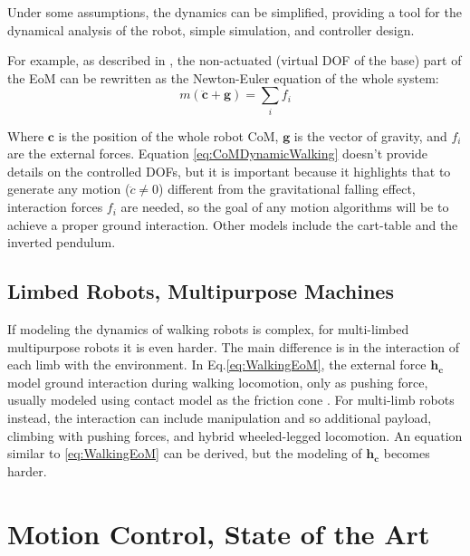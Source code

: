 Under some assumptions, the dynamics can be simplified\cite{Legged}\cite{HumanoidRobot}\cite{HandbookLegged}\cite{ModelingControlLegged}, providing a tool for the dynamical analysis of the robot, simple simulation, and controller design.  

For example, as described in \cite{ModelingControlLegged}\cite{Legged}\cite{ArticulatedRobots}, the non-actuated (virtual DOF of the base) part of the EoM can be rewritten as the Newton-Euler equation of the whole system: 
\begin{equation}
    \label{eq:CoMDynamicWalking}
    m(\ddot{\mathbf{c}} + \mathbf{g}) = \sum_i{f_i}
\end{equation}

Where $\mathbf{c}$ is the position of the whole robot CoM, $\mathbf{g}$ is the vector of gravity, and $f_i$ are the external forces. 
Equation \ref{eq:CoMDynamicWalking} doesn't provide details on the controlled DOFs, but it is important because it highlights that to generate any motion ($\ddot{c} \not= 0$) different from the gravitational falling effect, interaction forces $f_i$ are needed, so the goal of any motion algorithms will be to achieve a proper ground interaction.
Other models include the cart-table and the inverted pendulum\cite{Todd}.


\subsection{Limbed Robots, Multipurpose Machines}
\label{sec:limbedDyn}
If modeling the dynamics of walking robots is complex, for multi-limbed multipurpose robots it is even harder. The main difference is in the interaction of each limb with the environment. In Eq.\ref{eq:WalkingEoM}, the external force $\mathbf{h_c}$ model ground interaction during walking locomotion, only as pushing force, usually modeled using contact model as the friction cone \cite{ModelingControlLegged}\cite{WBCFocchi}. For multi-limb robots instead, the interaction can include manipulation and so additional payload, climbing with pushing forces\cite{RibeiroGroundGripping}, and hybrid wheeled-legged locomotion\cite{AnymalDocThesis}. An equation similar to \ref{eq:WalkingEoM} can be derived, but the modeling of $\mathbf{h_c}$ becomes harder. 

\section{Motion Control, State of the Art}
\label{sec:motionControl}

